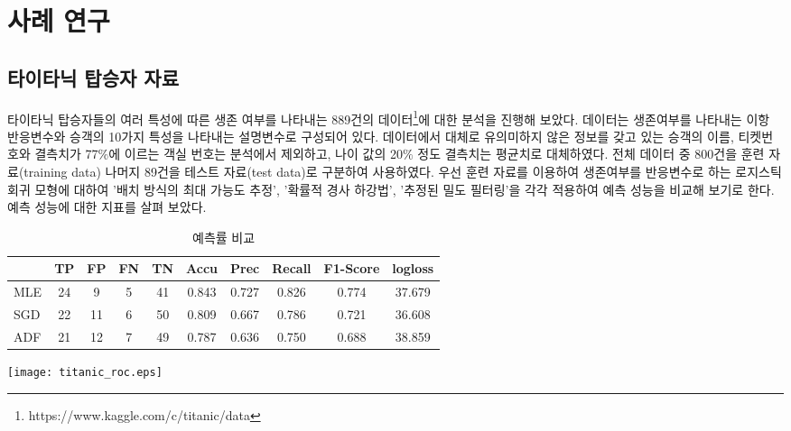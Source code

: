 \documentclass[oneside,b5paper,11pt]{book}
\theoremstyle{plain}
\theoremstyle{definition}
\theoremstyle{remark}
\theoremstyle{definition}
\numberwithin{equation}{chapter}
\begin{document}
%
%
\chapter{사례 연구}

\section{타이타닉 탑승자 자료}
 타이타닉 탑승자들의 여러 특성에 따른 생존 여부를 나타내는 889건의 데이터\footnote{https://www.kaggle.com/c/titanic/data}에 대한 분석을 진행해 보았다. 데이터는 생존여부를 나타내는 이항 반응변수와 승객의 10가지 특성을 나타내는 설명변수로 구성되어 있다. 데이터에서 대체로 유의미하지 않은 정보를 갖고 있는 승객의 이름, 티켓번호와 결측치가 77$\%$에 이르는 객실 번호는 분석에서 제외하고, 나이 값의 20$\%$ 정도 결측치는 평균치로 대체하였다. 전체 데이터 중 800건을 훈련 자료(training data) 나머지 89건을 테스트 자료(test data)로 구분하여 사용하였다.
 우선 훈련 자료를 이용하여 생존여부를 반응변수로 하는 로지스틱 회귀 모형에 대하여 '배치 방식의 최대 가능도 추정', '확률적 경사 하강법', '추정된 밀도 필터링'을 각각 적용하여 예측 성능을 비교해 보기로 한다. 예측 성능에 대한 지표를 살펴 보았다.


\begin{table}[ht]
	\centering
	\begin{tabular}{cccccccccc}
	\hline\hline
	\textbf{} & \textbf{TP} & \textbf{FP} & \textbf{FN} & \textbf{TN} & \textbf{Accu} & \textbf{Prec} & \textbf{Recall} & \textbf{F1-Score} & \textbf{logloss}  \\
	\hline
	
	\multicolumn {1}{l|}{MLE} & 24 & 9  & 5 & 41 & 0.843 & 0.727 & 0.826 & 0.774 & 37.679 \\ \hline
	\multicolumn {1}{l|}{SGD} & 22 & 11 & 6 & 50 & 0.809 & 0.667 & 0.786 & 0.721 & 36.608 \\ \hline
	\multicolumn {1}{l|}{ADF} & 21 & 12 & 7 & 49 & 0.787 & 0.636 & 0.750 & 0.688 & 38.859 \\ \hline

	\hline
	\end{tabular}
	
	\caption[예측률 비교, 타이타닉 데이터]{예측률 비교}
\end{table}


\begin{center}
\texttt{[image: titanic\_roc.eps]} %
\end{center}
\end{document}
